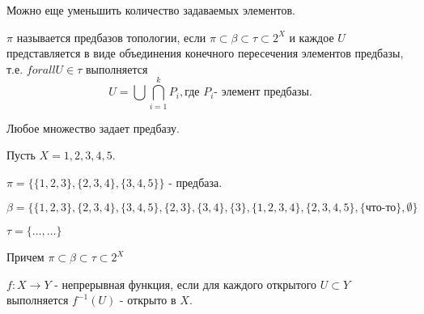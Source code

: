 Можно еще уменьшить количество задаваемых элементов.

\begin{definition}
    $\pi$ называется предбазов топологии, если $\pi \subset \beta \subset \tau \subset 2^X$ и каждое $U$ представляется в виде объединения конечного пересечения элементов предбазы, т.е. $forall U \in \tau$ выполняется
    \[
        U = \bigcup \bigcap_{i = 1}^k P_i, \text{где } P_i \text{- элемент предбазы}.
    \]
\end{definition}

\begin{nota_bene}
    Любое множество задает предбазу.
\end{nota_bene}

\wip
\begin{example}
    Пусть $X = {1,2,3,4,5}$.

    $\pi = \{\{1,2,3\}, \{2,3,4\}, \{3,4,5\}\}$ - предбаза.

    $\beta = \{\{1,2,3\}, \{2,3,4\}, \{3,4,5\}, \{2,3\}, \{3,4\}, \{3\}, \{1,2,3,4\}, \{2,3,4,5\}, \{\textbf{что-то}\}, \emptyset\}$

    $\tau = \{\ldots, \ldots\}$

    Причем $\pi \subset \beta \subset \tau \subset 2^X$
\end{example}

\begin{definition}
    $f: X \rightarrow Y$ - непрерывная функция, если для каждого открытого $U \subset Y$ выполняется $f^{-1}(U)$ - открыто в $X$.
\end{definition}
